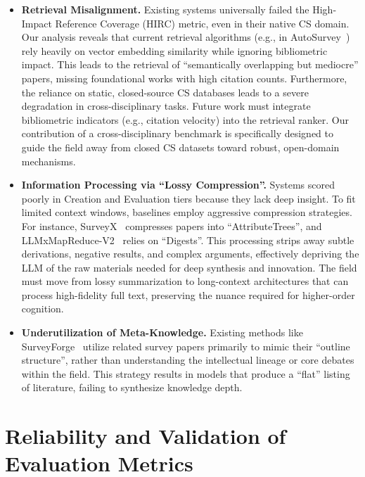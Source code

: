 \documentclass[11pt]{article}
\begin{document}
\begin{itemize}[leftmargin=*, parsep=8pt]
    \item \textbf{Retrieval Misalignment.} Existing systems universally failed the High-Impact Reference Coverage (HIRC) metric, even in their native CS domain. Our analysis reveals that current retrieval algorithms (e.g., in AutoSurvey~\cite{wang2024autosurvey}) rely heavily on vector embedding similarity while ignoring bibliometric impact. This leads to the retrieval of ``semantically overlapping but mediocre'' papers, missing foundational works with high citation counts. Furthermore, the reliance on static, closed-source CS databases leads to a severe degradation in cross-disciplinary tasks. Future work must integrate bibliometric indicators (e.g., citation velocity) into the retrieval ranker. Our contribution of a cross-disciplinary benchmark is specifically designed to guide the field away from closed CS datasets toward robust, open-domain mechanisms.

    \item \textbf{Information Processing via ``Lossy Compression''.} Systems scored poorly in Creation and Evaluation tiers because they lack deep insight. To fit limited context windows, baselines employ aggressive compression strategies. For instance, SurveyX~\cite{liang2025surveyx} compresses papers into ``AttributeTrees'', and LLMxMapReduce-V2~\cite{wang2025llmmapreducev2} relies on ``Digests''. This processing strips away subtle derivations, negative results, and complex arguments, effectively depriving the LLM of the raw materials needed for deep synthesis and innovation. The field must move from lossy summarization to long-context architectures that can process high-fidelity full text, preserving the nuance required for higher-order cognition.

    \item \textbf{Underutilization of Meta-Knowledge.} Existing methods like SurveyForge~\cite{yan2025surveyforge} utilize related survey papers primarily to mimic their ``outline structure'', rather than understanding the intellectual lineage or core debates within the field. This strategy results in models that produce a ``flat'' listing of literature, failing to synthesize knowledge depth. 
\end{itemize}

\section{Reliability and Validation of Evaluation Metrics}
\label{sec:appendix_validation}
\end{document}
